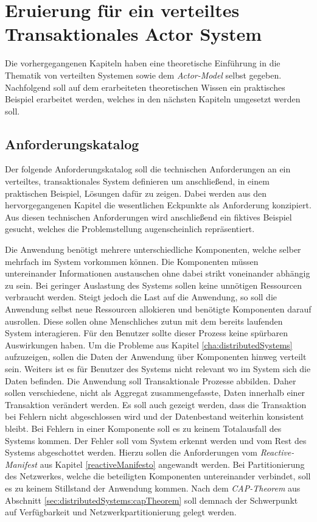\chapter{Eruierung für ein verteiltes Transaktionales Actor System} \label{cha:Eruierung}
Die vorhergegangenen Kapiteln haben eine theoretische Einführung in die Thematik von verteilten Systemen sowie dem \textit{Actor-Model} selbst gegeben. Nachfolgend soll auf dem erarbeiteten theoretischen Wissen ein praktisches Beispiel erarbeitet werden, welches in den nächsten Kapiteln umgesetzt werden soll.  

\section{Anforderungskatalog}\label{sec:Eruierung:technicalRequierements}
Der folgende Anforderungskatalog soll die technischen Anforderungen an ein verteiltes, transaktionales System definieren um anschließend, in einem praktischen Beispiel, Lösungen dafür zu zeigen. Dabei werden aus den hervorgegangenen Kapitel die  wesentlichen Eckpunkte als Anforderung konzipiert. Aus diesen technischen Anforderungen wird anschließend ein fiktives Beispiel gesucht, welches die Problemstellung augenscheinlich repräsentiert.
\begin{enumerate}
    Die Anwendung benötigt mehrere unterschiedliche Komponenten, welche selber mehrfach im System vorkommen können. Die Komponenten müssen untereinander Informationen austauschen ohne dabei strikt voneinander abhängig zu sein.
    Bei geringer Auslastung des Systems sollen keine unnötigen Ressourcen verbraucht werden. Steigt jedoch die Last auf die Anwendung, so soll die Anwendung selbst neue Ressourcen allokieren und benötigte Komponenten darauf ausrollen. Diese sollen ohne Menschliches zutun mit dem bereits laufenden System interagieren. Für den Benutzer sollte dieser Prozess keine spürbaren Auswirkungen haben.
    Um die Probleme aus Kapitel \ref{cha:distributedSystems} aufzuzeigen, sollen die Daten der Anwendung über Komponenten hinweg verteilt sein. Weiters ist es für Benutzer des Systems nicht relevant wo im System sich die Daten befinden. 
    Die Anwendung soll Transaktionale Prozesse abbilden. Daher sollen verschiedene, nicht als Aggregat zusammengefasste, Daten innerhalb einer Transaktion verändert werden. Es soll auch gezeigt werden, dass die Transaktion bei Fehlern nicht abgeschlossen wird und der Datenbestand weiterhin konsistent bleibt.
    Bei Fehlern in einer Komponente soll es zu keinem Totalausfall des Systems kommen. Der Fehler soll vom System erkennt werden und vom Rest des Systems abgeschottet werden. Hierzu sollen die Anforderungen vom \textit{Reactive-Manifest} aus Kapitel \ref{reactiveManifesto} angewandt werden.
    Bei Partitionierung des Netzwerkes, welche die beteiligten Komponenten untereinander verbindet, soll es zu keinem Stillstand der Anwendung kommen. Nach dem \textit{CAP-Theorem} aus Abschnitt \ref{sec:distributedSystems:capTheorem} soll demnach der Schwerpunkt auf Verfügbarkeit und Netzwerkpartitionierung gelegt werden. 
\end{enumerate}
